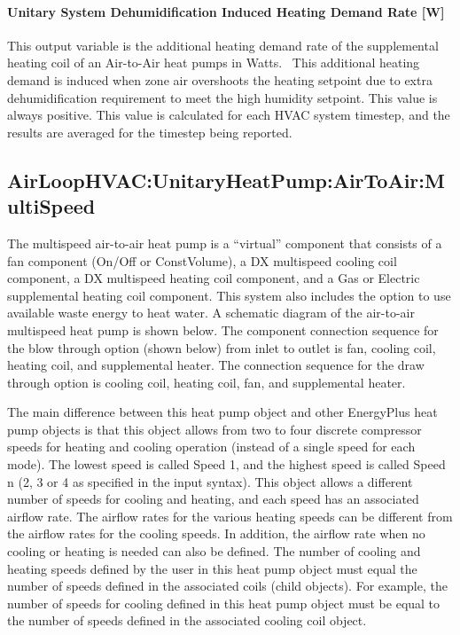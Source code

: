 \paragraph{Unitary System Dehumidification Induced Heating Demand Rate {[}W{]}}\label{unitary-system-dehumidification-induced-heating-demand-rate-w}

This output variable is the additional heating demand rate of the supplemental heating coil of an Air-to-Air heat pumps in Watts.~ This additional heating demand is induced when zone air overshoots the heating setpoint due to extra dehumidification requirement to meet the high humidity setpoint. This value is always positive. This value is calculated for each HVAC system timestep, and the results are averaged for the timestep being reported.

\subsection{AirLoopHVAC:UnitaryHeatPump:AirToAir:MultiSpeed}\label{airloophvacunitaryheatpumpairtoairmultispeed}

The multispeed air-to-air heat pump is a ``virtual'' component that consists of a fan component (On/Off or ConstVolume), a DX multispeed cooling coil component, a DX multispeed heating coil component, and a Gas or Electric supplemental heating coil component. This system also includes the option to use available waste energy to heat water. A schematic diagram of the air-to-air multispeed heat pump is shown below. The component connection sequence for the blow through option (shown below) from inlet to outlet is fan, cooling coil, heating coil, and supplemental heater. The connection sequence for the draw through option is cooling coil, heating coil, fan, and supplemental heater.

The main difference between this heat pump object and other EnergyPlus heat pump objects is that this object allows from two to four discrete compressor speeds for heating and cooling operation (instead of a single speed for each mode). The lowest speed is called Speed 1, and the highest speed is called Speed n (2, 3 or 4 as specified in the input syntax). This object allows a different number of speeds for cooling and heating, and each speed has an associated airflow rate. The airflow rates for the various heating speeds can be different from the airflow rates for the cooling speeds. In addition, the airflow rate when no cooling or heating is needed can also be defined. The number of cooling and heating speeds defined by the user in this heat pump object must equal the number of speeds defined in the associated coils (child objects). For example, the number of speeds for cooling defined in this heat pump object must be equal to the number of speeds defined in the associated cooling coil object.

